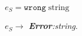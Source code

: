 \begin{case}
$e_{S}=\mathtt{wrong}\;\mathrm{string}$

$e_{S}\rightarrow$ \emph{\textbf{Error}:\;string}.
\end{case}